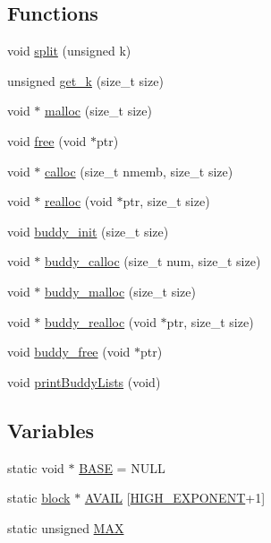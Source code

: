 \subsection*{Functions}
\begin{DoxyCompactItemize}
\item 
void \hyperlink{buddy-src_2buddy_8c_ac760e60c430db059b441b92fc4df7a76}{split} (unsigned k)
\item 
unsigned \hyperlink{buddy-src_2buddy_8c_ace437012ee7b47ec3cda621f90fff0de}{get\+\_\+k} (size\+\_\+t size)
\item 
void $\ast$ \hyperlink{buddy-src_2buddy_8c_a9c36d0fe3ec4675cbffdc9b52f5fb399}{malloc} (size\+\_\+t size)
\item 
void \hyperlink{buddy-src_2buddy_8c_afbedc913aa4651b3c3b4b3aecd9b4711}{free} (void $\ast$ptr)
\item 
void $\ast$ \hyperlink{buddy-src_2buddy_8c_a2807e26a012717736641384f91ab2563}{calloc} (size\+\_\+t nmemb, size\+\_\+t size)
\item 
void $\ast$ \hyperlink{buddy-src_2buddy_8c_ad28fed1039f35d754710633141b4edf0}{realloc} (void $\ast$ptr, size\+\_\+t size)
\item 
void \hyperlink{buddy-src_2buddy_8c_a6ed1593775eeb819df9178b668ac88bf}{buddy\+\_\+init} (size\+\_\+t size)
\item 
void $\ast$ \hyperlink{buddy-src_2buddy_8c_acb1fb807820b9fbe1e6c7e6c65a7745c}{buddy\+\_\+calloc} (size\+\_\+t num, size\+\_\+t size)
\item 
void $\ast$ \hyperlink{buddy-src_2buddy_8c_a183a1669a60daf8038404f3c9bc18a57}{buddy\+\_\+malloc} (size\+\_\+t size)
\item 
void $\ast$ \hyperlink{buddy-src_2buddy_8c_ab59e427c914a67f0872310ec2e84d1b5}{buddy\+\_\+realloc} (void $\ast$ptr, size\+\_\+t size)
\item 
void \hyperlink{buddy-src_2buddy_8c_a2d38d5280dce5d4f0b85410e00c293a6}{buddy\+\_\+free} (void $\ast$ptr)
\item 
void \hyperlink{buddy-src_2buddy_8c_a5eaf773600a0002687be834fa8cf0f04}{print\+Buddy\+Lists} (void)
\end{DoxyCompactItemize}
\subsection*{Variables}
\begin{DoxyCompactItemize}
\item 
static void $\ast$ \hyperlink{buddy-src_2buddy_8c_a6381f624a5f40caf03dd82cbaec1b8ce}{B\+A\+S\+E} = N\+U\+L\+L
\item 
static \hyperlink{structblock}{block} $\ast$ \hyperlink{buddy-src_2buddy_8c_a370a7525a3ea65be5d4498f333ed4b13}{A\+V\+A\+I\+L} \mbox{[}\hyperlink{buddy__mem__manager_2buddy_8c_a74799bfafd636c36aeaed4c045acb907}{H\+I\+G\+H\+\_\+\+E\+X\+P\+O\+N\+E\+N\+T}+1\mbox{]}
\item 
static unsigned \hyperlink{buddy-src_2buddy_8c_a610eae7876cc80877113d53851722291}{M\+A\+X}
\end{DoxyCompactItemize}


